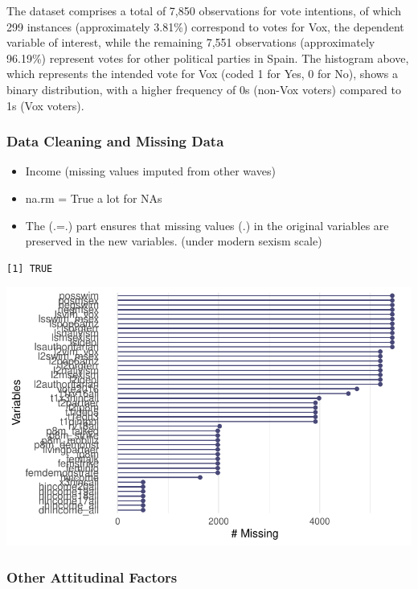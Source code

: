 \documentclass[
  letterpaper,
  DIV=11,
  numbers=noendperiod]{scrartcl}
\begin{document}
The dataset comprises a total of 7,850 observations for vote intentions,
of which 299 instances (approximately 3.81\%) correspond to votes for
Vox, the dependent variable of interest, while the remaining 7,551
observations (approximately 96.19\%) represent votes for other political
parties in Spain. The histogram above, which represents the intended
vote for Vox (coded 1 for Yes, 0 for No), shows a binary distribution,
with a higher frequency of 0s (non-Vox voters) compared to 1s (Vox
voters).

\subsubsection{Data Cleaning and Missing
Data}\label{data-cleaning-and-missing-data}

\begin{itemize}
\item
  Income (missing values imputed from other waves)
\item
  na.rm = True a lot for NAs
\item
  The (.=.) part ensures that missing values (.) in the original
  variables are preserved in the new variables. (under modern sexism
  scale)
\end{itemize}

\begin{verbatim}
[1] TRUE
\end{verbatim}

\includegraphics{reprod_sexism_files/figure-pdf/unnamed-chunk-4-1.pdf}

\subsubsection{Other Attitudinal
Factors}\label{other-attitudinal-factors}
\end{document}
